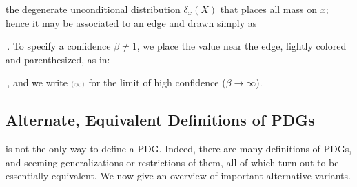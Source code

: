 the degenerate unconditional distribution $\delta_x(X)$ that places all mass on $x$;
hence it may be associated to an edge and drawn simply as
\,.
To specify a confidence $\beta \ne 1$,
we place the value near the edge, lightly colored and parenthesized, as in:
\!\!\!\!
\,,
and we write ${\scriptstyle\color{gray}(\infty)}$ for the limit of high confidence ($\beta\!\to\! \infty$). %





\subsection{Alternate, Equivalent Definitions of PDGs}
    \label{sec:alt-pdgs}

 is not the only way to define a PDG. 
Indeed, there are many definitions of PDGs, and seeming generalizations
or restrictions of them, all of which turn out to be essentially equivalent. 
We now give an overview of important alternative variants.

